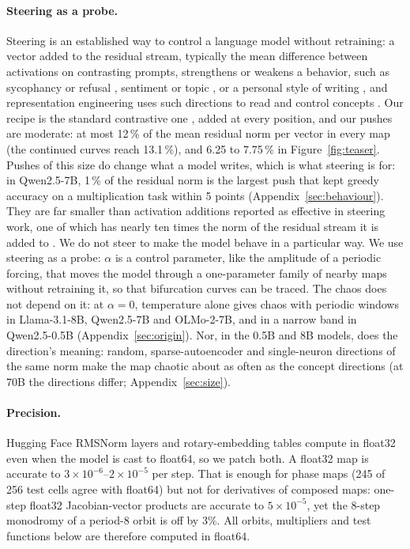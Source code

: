 \documentclass[11pt,letterpaper]{article}
\begin{document}
\paragraph{Steering as a probe.} Steering is an established way to control a language model without retraining: a
vector added to the residual stream, typically the mean difference between activations on contrasting prompts,
strengthens or weakens a behavior, such as sycophancy or refusal \cite{rimsky2024steering}, sentiment or topic
\cite{turner2023activation}, or a personal style of writing \cite{zhang2025steering}, and representation engineering
uses such directions to read and control concepts \cite{zou2023representation}. Our recipe is the standard contrastive
one \cite{rimsky2024steering}, added at every position, and our pushes are moderate: at most 12\,\% of the mean residual
norm per vector in every map (the continued curves reach 13.1\,\%), and 6.25 to 7.75\,\% in Figure~\ref{fig:teaser}.
Pushes of this size do change what a model writes, which is what steering is for: in Qwen2.5-7B, 1\,\% of the residual
norm is the largest push that kept greedy accuracy on a multiplication task within 5 points (Appendix~\ref{sec:behaviour}). They are
far smaller than activation additions reported as effective in steering work, one of which has nearly ten times the
norm of the residual stream it is added to \cite{turner2023activation}. We do not steer to make the model behave in a
particular way. We use steering as a probe: $\alpha$ is a control parameter, like the amplitude of a periodic forcing,
that moves the model through a one-parameter family of nearby maps without retraining it, so that bifurcation curves
can be traced. The chaos does not depend on it: at $\alpha=0$, temperature alone gives chaos with periodic windows in
Llama-3.1-8B, Qwen2.5-7B and OLMo-2-7B, and in a narrow band in Qwen2.5-0.5B (Appendix~\ref{sec:origin}). Nor, in the 0.5B and 8B
models, does the direction's meaning: random, sparse-autoencoder and single-neuron directions of the same norm make the
map chaotic about as often as the concept directions (at 70B the directions differ; Appendix~\ref{sec:size}).

\paragraph{Precision.} Hugging Face RMSNorm layers and rotary-embedding tables compute in float32 even when the
model is cast to float64, so we patch both. A float32 map is accurate to $3\times10^{-6}$--$2\times10^{-5}$ per
step. That is enough for phase maps (245 of 256 test cells agree with float64) but not for derivatives of composed
maps: one-step float32 Jacobian-vector products are accurate to $5\times10^{-5}$, yet the 8-step monodromy of a
period-8 orbit is off by 3\%. All orbits, multipliers and test functions below are therefore computed in float64.
\end{document}

